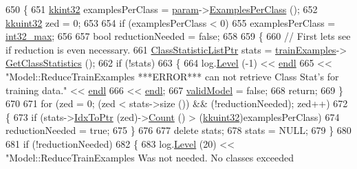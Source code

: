 \begin{DoxyCode}
650 \{
651   \hyperlink{namespace_k_k_b_a8fa4952cc84fda1de4bec1fbdd8d5b1b}{kkint32}  examplesPerClass = \hyperlink{class_k_k_m_l_l_1_1_model_a46bd4d1b3ab8d3d9847c1b00b7c0b66f}{param}->\hyperlink{class_k_k_m_l_l_1_1_model_param_a84cad7375c43129ba19855444b6a8a68}{ExamplesPerClass} ();
652   \hyperlink{namespace_k_k_b_af8d832f05c54994a1cce25bd5743e19a}{kkuint32}  zed = 0;
653 
654   \textcolor{keywordflow}{if}  (examplesPerClass < 0)
655     examplesPerClass = \hyperlink{_k_k_base_types_8h_ab1240c5d3fea865121ed4684f8e968f6}{int32\_max};
656 
657   \textcolor{keywordtype}{bool}  reductionNeeded = \textcolor{keyword}{false};
658 
659   \{
660     \textcolor{comment}{// First lets see if reduction is even necessary.}
661     \hyperlink{class_k_k_m_l_l_1_1_class_statistic_list}{ClassStatisticListPtr}  stats = \hyperlink{class_k_k_m_l_l_1_1_model_a49f61d35489e1782cd31858fd0082f8e}{trainExamples}->
      \hyperlink{class_k_k_m_l_l_1_1_feature_vector_list_a25d68202689dd6400dcf9a3b18fd5ad9}{GetClassStatistics} ();
662     \textcolor{keywordflow}{if}  (!stats)
663     \{
664       log.\hyperlink{class_k_k_b_1_1_run_log_a32cf761d7f2e747465fd80533fdbb659}{Level} (-1) << \hyperlink{namespace_k_k_b_ad1f50f65af6adc8fa9e6f62d007818a8}{endl}
665         << \textcolor{stringliteral}{"Model::ReduceTrainExamples   ***ERROR***  can not retrieve Class Stat's for training data."} << 
      \hyperlink{namespace_k_k_b_ad1f50f65af6adc8fa9e6f62d007818a8}{endl}
666         << \hyperlink{namespace_k_k_b_ad1f50f65af6adc8fa9e6f62d007818a8}{endl};
667       \hyperlink{class_k_k_m_l_l_1_1_model_af881a051b703412686fa3b4a62b6d68a}{validModel} = \textcolor{keyword}{false};
668       \textcolor{keywordflow}{return};
669     \}
670 
671     \textcolor{keywordflow}{for}  (zed = 0;  (zed < stats->size ())  &&  (!reductionNeeded);  zed++)
672     \{
673       \textcolor{keywordflow}{if}  (stats->\hyperlink{class_k_k_b_1_1_k_k_queue_acce2bdd8b3327e38266cf198382cd852}{IdxToPtr} (zed)->\hyperlink{class_k_k_m_l_l_1_1_class_statistic_ace228f15b538c012781b4f6800c837c5}{Count} () > (\hyperlink{namespace_k_k_b_af8d832f05c54994a1cce25bd5743e19a}{kkuint32})examplesPerClass)
674         reductionNeeded  = \textcolor{keyword}{true};
675     \}
676 
677     \textcolor{keyword}{delete}  stats;
678     stats = NULL;
679   \}
680 
681   \textcolor{keywordflow}{if}  (!reductionNeeded)
682   \{
683     log.\hyperlink{class_k_k_b_1_1_run_log_a32cf761d7f2e747465fd80533fdbb659}{Level} (20) << \textcolor{stringliteral}{"Model::ReduceTrainExamples    Was not needed.  No classes exceeded
}
\end{DoxyCode}
